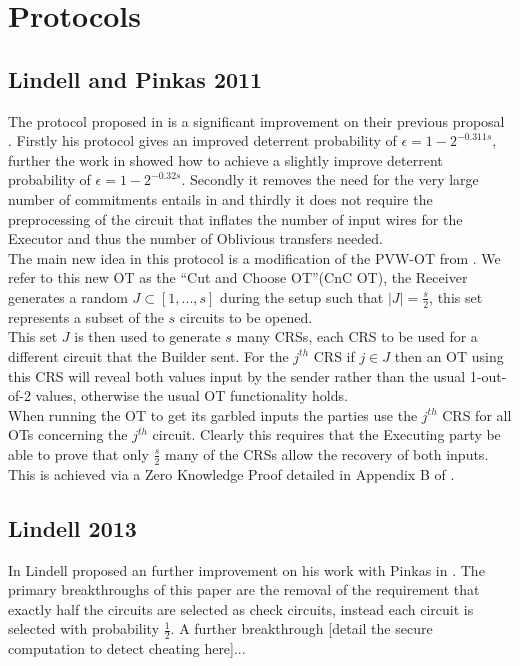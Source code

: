 \documentclass[a4paper,11pt]{article}
\begin{document}
	\section{Protocols} \label{sec:Protocols}
		\subsection{Lindell and Pinkas 2011}
			The protocol proposed in \cite{LindellAndPinkas2011} is a significant improvement on their previous proposal \cite{LindellAndPinkas2007}. Firstly his protocol gives an improved deterrent probability of $\epsilon = 1 - 2^{-0.311s}$, further the work in \cite{ShelatAndShen} showed how to achieve a slightly improve deterrent probability of $\epsilon = 1 - 2^{-0.32s}$. Secondly it removes the need for the very large number of commitments entails in \cite{LindellAndPinkas2007} and thirdly it does not require the preprocessing of the circuit that inflates the number of input wires for the Executor and thus the number of Oblivious transfers needed.\\

			The main new idea in this protocol is a modification of the PVW-OT from \cite{PVW_OT_2008}. We refer to this new OT as the ``Cut and Choose OT''(CnC OT), the Receiver generates a random $J \subset [1, ..., s]$ during the setup such that $\vert J \vert = \frac{s}{2}$, this set represents a subset of the $s$ circuits to be opened.\\

			This set $J$ is then used to generate $s$ many CRSs, each CRS to be used for a different circuit that the Builder sent. For the $j^{th}$ CRS if $j \in J$ then an OT using this CRS will reveal both values input by the sender rather than the usual 1-out-of-2 values, otherwise the usual OT functionality holds.\\

			When running the OT to get its garbled inputs the parties use the $j^{th}$ CRS for all OTs concerning the $j^{th}$ circuit. Clearly this requires that the Executing party be able to prove that only $\frac{s}{2}$ many of the CRSs allow the recovery of both inputs. This is achieved via a Zero Knowledge Proof detailed in Appendix B of \cite{LindellAndPinkas2011}.

		\subsection{Lindell 2013}
			In \cite{Lindell_CnC_2013} Lindell proposed an further improvement on his work with Pinkas in \cite{LindellAndPinkas2011}. The primary breakthroughs of this paper are the removal of the requirement that exactly half the circuits are selected as check circuits, instead each circuit is selected with probability $\frac{1}{2}$. A further breakthrough [detail the secure computation to detect cheating here]...
\end{document}
